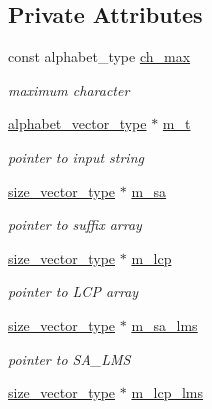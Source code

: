 \subsection*{Private Attributes}
\begin{DoxyCompactItemize}
\item 
const alphabet\+\_\+type \hyperlink{struct_validate4_1_1_r_scan_a3ff6f0be3fd0b25c66913d4d08b2e143}{ch\+\_\+max}
\begin{DoxyCompactList}\small\item\em maximum character \end{DoxyCompactList}\item 
\hyperlink{class_validate4_a49c80b3d101be19542a4341c2387603a}{alphabet\+\_\+vector\+\_\+type} $\ast$ \hyperlink{struct_validate4_1_1_r_scan_a9d9ce16aa2eacc32f54cc88e8746a73a}{m\+\_\+t}
\begin{DoxyCompactList}\small\item\em pointer to input string \end{DoxyCompactList}\item 
\hyperlink{class_validate4_a46ea31a0a4b23f583806792160421d15}{size\+\_\+vector\+\_\+type} $\ast$ \hyperlink{struct_validate4_1_1_r_scan_ab656e7db03298be8ce72f202e5aa5e77}{m\+\_\+sa}
\begin{DoxyCompactList}\small\item\em pointer to suffix array \end{DoxyCompactList}\item 
\hyperlink{class_validate4_a46ea31a0a4b23f583806792160421d15}{size\+\_\+vector\+\_\+type} $\ast$ \hyperlink{struct_validate4_1_1_r_scan_a5521d8d0a72b169e07da61abd5463634}{m\+\_\+lcp}
\begin{DoxyCompactList}\small\item\em pointer to L\+CP array \end{DoxyCompactList}\item 
\hyperlink{class_validate4_a46ea31a0a4b23f583806792160421d15}{size\+\_\+vector\+\_\+type} $\ast$ \hyperlink{struct_validate4_1_1_r_scan_a7427660483d5beb9bbf8e6a69c291c25}{m\+\_\+sa\+\_\+lms}
\begin{DoxyCompactList}\small\item\em pointer to S\+A\+\_\+\+L\+MS \end{DoxyCompactList}\item 
\hyperlink{class_validate4_a46ea31a0a4b23f583806792160421d15}{size\+\_\+vector\+\_\+type} $\ast$ \hyperlink{struct_validate4_1_1_r_scan_adf3e4856d77cd795d6b00b2355bd48bd}{m\+\_\+lcp\+\_\+lms}

\end{DoxyCompactItemize}
